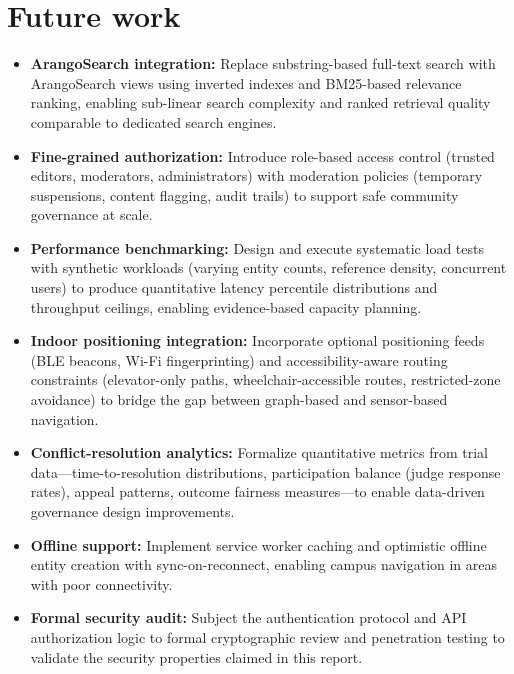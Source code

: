 \documentclass[13pt,a4paper]{report}
\begin{document}
\section{Future work}
\begin{itemize}
    \item \textbf{ArangoSearch integration:} Replace substring-based full-text search with ArangoSearch views using inverted indexes and BM25-based relevance ranking, enabling sub-linear search complexity and ranked retrieval quality comparable to dedicated search engines.

    \item \textbf{Fine-grained authorization:} Introduce role-based access control (trusted editors, moderators, administrators) with moderation policies (temporary suspensions, content flagging, audit trails) to support safe community governance at scale.

    \item \textbf{Performance benchmarking:} Design and execute systematic load tests with synthetic workloads (varying entity counts, reference density, concurrent users) to produce quantitative latency percentile distributions and throughput ceilings, enabling evidence-based capacity planning.

    \item \textbf{Indoor positioning integration:} Incorporate optional positioning feeds (BLE beacons, Wi-Fi fingerprinting) and accessibility-aware routing constraints (elevator-only paths, wheelchair-accessible routes, restricted-zone avoidance) to bridge the gap between graph-based and sensor-based navigation.

    \item \textbf{Conflict-resolution analytics:} Formalize quantitative metrics from trial data---time-to-resolution distributions, participation balance (judge response rates), appeal patterns, outcome fairness measures---to enable data-driven governance design improvements.

    \item \textbf{Offline support:} Implement service worker caching and optimistic offline entity creation with sync-on-reconnect, enabling campus navigation in areas with poor connectivity.

    \item \textbf{Formal security audit:} Subject the authentication protocol and API authorization logic to formal cryptographic review and penetration testing to validate the security properties claimed in this report.
\end{itemize}



\end{document}
